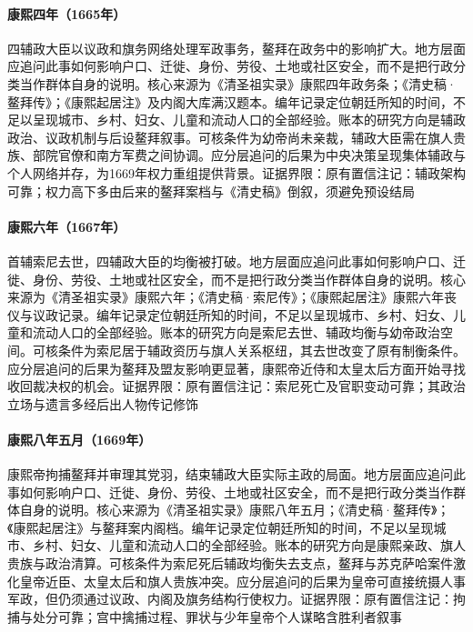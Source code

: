 \hypertarget{social:EQ-1665-REGENTS-CONSOLIDATION}{}\paragraph{康熙四年（1665年）}四辅政大臣以议政和旗务网络处理军政事务，鳌拜在政务中的影响扩大。地方层面应追问此事如何影响户口、迁徙、身份、劳役、土地或社区安全，而不是把行政分类当作群体自身的说明。核心来源为《清圣祖实录》康熙四年政务条；《清史稿·鳌拜传》；《康熙起居注》及内阁大库满汉题本。编年记录定位朝廷所知的时间，不足以呈现城市、乡村、妇女、儿童和流动人口的全部经验。账本的研究方向是辅政政治、议政机制与后设鳌拜叙事。可核条件为幼帝尚未亲裁，辅政大臣需在旗人贵族、部院官僚和南方军费之间协调。应分层追问的后果为中央决策呈现集体辅政与个人网络并存，为1669年权力重组提供背景。证据界限：原有置信注记：辅政架构可靠；权力高下多由后来的鳌拜案档与《清史稿》倒叙，须避免预设结局
\hypertarget{social:EQ-1667-SONI-DEATH}{}\paragraph{康熙六年（1667年）}首辅索尼去世，四辅政大臣的均衡被打破。地方层面应追问此事如何影响户口、迁徙、身份、劳役、土地或社区安全，而不是把行政分类当作群体自身的说明。核心来源为《清圣祖实录》康熙六年；《清史稿·索尼传》；《康熙起居注》康熙六年丧仪与议政记录。编年记录定位朝廷所知的时间，不足以呈现城市、乡村、妇女、儿童和流动人口的全部经验。账本的研究方向是索尼去世、辅政均衡与幼帝政治空间。可核条件为索尼居于辅政资历与旗人关系枢纽，其去世改变了原有制衡条件。应分层追问的后果为鳌拜及盟友影响更显著，康熙帝近侍和太皇太后方面开始寻找收回裁决权的机会。证据界限：原有置信注记：索尼死亡及官职变动可靠；其政治立场与遗言多经后出人物传记修饰
\hypertarget{social:EQ-1669-OBOI-ARREST}{}\paragraph{康熙八年五月（1669年）}康熙帝拘捕鳌拜并审理其党羽，结束辅政大臣实际主政的局面。地方层面应追问此事如何影响户口、迁徙、身份、劳役、土地或社区安全，而不是把行政分类当作群体自身的说明。核心来源为《清圣祖实录》康熙八年五月；《清史稿·鳌拜传》；《康熙起居注》与鳌拜案内阁档。编年记录定位朝廷所知的时间，不足以呈现城市、乡村、妇女、儿童和流动人口的全部经验。账本的研究方向是康熙亲政、旗人贵族与政治清算。可核条件为索尼死后辅政均衡失去支点，鳌拜与苏克萨哈案件激化皇帝近臣、太皇太后和旗人贵族冲突。应分层追问的后果为皇帝可直接统摄人事军政，但仍须通过议政、内阁及旗务结构行使权力。证据界限：原有置信注记：拘捕与处分可靠；宫中擒捕过程、罪状与少年皇帝个人谋略含胜利者叙事
